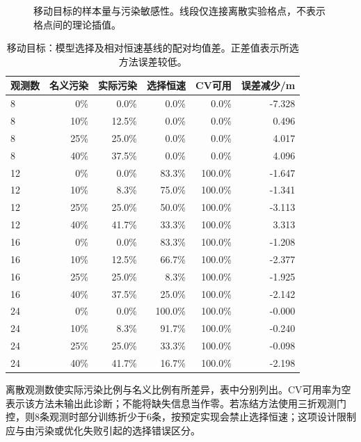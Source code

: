 \begin{figure}[H]\centering
{}
\caption{移动目标的样本量与污染敏感性。线段仅连接离散实验格点，不表示格点间的理论插值。}
\label{fig:sensitivity-moving_outliers}
\end{figure}

\begin{table}[H]\centering\small
\caption{移动目标：模型选择及相对恒速基线的配对均值差。正差值表示所选方法误差较低。}

\begin{tabular}{lrrrrr}
\toprule
观测数 & 名义污染 & 实际污染 & 选择恒速 & CV可用 & 误差减少/m\\
\midrule
8 & 0\% & 0.0\% & 0.0\% & 0.0\% & -7.328\\
8 & 10\% & 12.5\% & 0.0\% & 0.0\% & 0.496\\
8 & 25\% & 25.0\% & 0.0\% & 0.0\% & 4.017\\
8 & 40\% & 37.5\% & 0.0\% & 0.0\% & 4.096\\
12 & 0\% & 0.0\% & 83.3\% & 100.0\% & -1.647\\
12 & 10\% & 8.3\% & 75.0\% & 100.0\% & -1.341\\
12 & 25\% & 25.0\% & 50.0\% & 100.0\% & -3.113\\
12 & 40\% & 41.7\% & 33.3\% & 100.0\% & 3.313\\
16 & 0\% & 0.0\% & 83.3\% & 100.0\% & -1.208\\
16 & 10\% & 12.5\% & 66.7\% & 100.0\% & -2.377\\
16 & 25\% & 25.0\% & 8.3\% & 100.0\% & -1.925\\
16 & 40\% & 37.5\% & 25.0\% & 100.0\% & -2.142\\
24 & 0\% & 0.0\% & 100.0\% & 100.0\% & -0.000\\
24 & 10\% & 8.3\% & 91.7\% & 100.0\% & -0.240\\
24 & 25\% & 25.0\% & 33.3\% & 100.0\% & -0.098\\
24 & 40\% & 41.7\% & 16.7\% & 100.0\% & -2.198\\
\bottomrule\end{tabular}\end{table}

离散观测数使实际污染比例与名义比例有所差异，表中分别列出。CV可用率为空表示该方法未输出此诊断；不能将缺失信息当作零。若冻结方法使用三折观测门控，则8条观测时部分训练折少于6条，按预定实现会禁止选择恒速；这项设计限制应与由污染或优化失败引起的选择错误区分。


